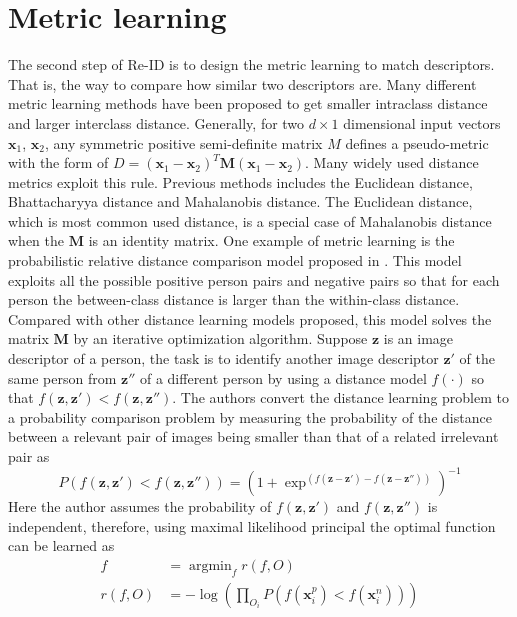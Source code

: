 \section{Metric learning}
The second step of Re-ID is to design the metric learning to match descriptors. That is, the way to compare how similar two descriptors are. Many different metric learning methods have been proposed \cite{KISSME, LFDA, PCCA, TDL, PRDC, LMNN, KLFDA, KCCA, KernelVersionMetrics, NFST, ITML} to get smaller intraclass distance and larger interclass distance. Generally, for two $d\times 1$ dimensional input vectors $\bm{x}_1$, $\bm{x}_2$, any symmetric positive semi-definite matrix $M$ defines a pseudo-metric with the form of $D = (\bm{x}_1 -\bm{x}_2)^T\bm{M}(\bm{x}_1 - \bm{x}_2)$. Many widely used distance metrics exploit this rule. Previous methods includes the Euclidean distance, Bhattacharyya distance and Mahalanobis distance. The Euclidean distance, which is most common used distance, is a special case of Mahalanobis distance when the $\bm{M}$ is an identity matrix. One example of metric learning is the probabilistic relative distance comparison model proposed in \cite{PRDC}. This model exploits all the possible positive person pairs and negative pairs so that for each person the between-class distance is larger than the within-class distance. Compared with other distance learning models proposed, this model solves the matrix $\bm{M}$ by an iterative optimization algorithm. Suppose $\bm{z}$ is an image descriptor of a person, the task is to identify another image descriptor $\bm{z}'$ of the same person from $\bm{z}''$ of a different person by using a distance model $f(\cdot)$ so that $f(\bm{z}, \bm{z}')< f(\bm{z}, \bm{z}'')$. The authors convert the distance learning problem to a probability comparison problem by measuring the probability of the distance between a relevant pair of images being smaller than that of a related irrelevant pair as
\begin{equation}
P(f(\bm{z},\bm{z}')<f(\bm{z},\bm{z}'')) = (1+\exp^{(f(\bm{z}-\bm{z}')-f(\bm{z}-\bm{z}''))})^{-1}
\end{equation}
Here the author assumes the probability of $f(\bm{z},\bm{z}')$ and $f(\bm{z},\bm{z}'')$ is independent, therefore, using maximal likelihood principal the optimal function can be learned as
\begin{equation}
\begin{aligned}
f &= \mathop{\arg\min}_f r(f,O) \\
r(f,O) &= -\log(\prod_{O_i}P(f(\bm{x}_i^p) < f(\bm{x}_i^n)))
\end{aligned}
\end{equation}
